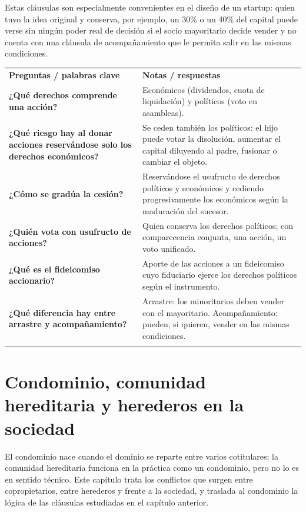 \documentclass[12pt,oneside]{book}
\newcommand{\cq}[1]{\textbf{#1}}
\newcommand{\cornell}[3]{%
  \par\medskip\noindent\begingroup
  \renewcommand{\arraystretch}{1.25}%
  \begin{tabularx}{\textwidth}{|>{\raggedright\arraybackslash}p{0.27\textwidth}|>{\raggedright\arraybackslash}X|}
    \hline
    \multicolumn{2}{|>{\centering\arraybackslash}X|}{\cellcolor{azulacad!12}\textbf{Cuadro Cornell --- #1}}\\ \hline
    \cellcolor{gray!10}\textbf{Preguntas / palabras clave} & \cellcolor{gray!10}\textbf{Notas / respuestas} \\ \hline
    #2
    \multicolumn{2}{|>{\raggedright\arraybackslash}X|}{\cellcolor{azulacad!6}\textbf{Resumen.} #3}\\ \hline
  \end{tabularx}%
  \endgroup\par\medskip}
\begin{document}
Estas cláusulas son especialmente convenientes en el diseño de un startup: quien tuvo la idea original y conserva, por ejemplo, un 30\% o un 40\% del capital puede verse sin ningún poder real de decisión si el socio mayoritario decide vender y no cuenta con una cláusula de acompañamiento que le permita salir en las mismas condiciones.

\cornell{Usufructo de acciones y cláusulas societarias}{
\cq{¿Qué derechos comprende una acción?} & Económicos (dividendos, cuota de liquidación) y políticos (voto en asambleas). \\ \hline
\cq{¿Qué riesgo hay al donar acciones reservándose solo los derechos económicos?} & Se ceden también los políticos: el hijo puede votar la disolución, aumentar el capital diluyendo al padre, fusionar o cambiar el objeto. \\ \hline
\cq{¿Cómo se gradúa la cesión?} & Reservándose el usufructo de derechos políticos y económicos y cediendo progresivamente los económicos según la maduración del sucesor. \\ \hline
\cq{¿Quién vota con usufructo de acciones?} & Quien conserva los derechos políticos; con comparecencia conjunta, una acción, un voto unificado. \\ \hline
\cq{¿Qué es el fideicomiso accionario?} & Aporte de las acciones a un fideicomiso cuyo fiduciario ejerce los derechos políticos según el instrumento. \\ \hline
\cq{¿Qué diferencia hay entre arrastre y acompañamiento?} & Arrastre: los minoritarios deben vender con el mayoritario. Acompañamiento: pueden, si quieren, vender en las mismas condiciones. \\ \hline
}{El usufructo de acciones permite planificar la sucesión de la empresa familiar conservando control, pero exige distinguir derechos económicos y políticos, y graduar su cesión. Las cláusulas de arrastre y acompañamiento protegen a mayoritarios y minoritarios frente a un cambio de control.}

\chapter{Condominio, comunidad hereditaria y herederos en la sociedad}
\label{cap:condominio}

El condominio nace cuando el dominio se reparte entre varios cotitulares; la comunidad hereditaria funciona en la práctica como un condominio, pero no lo es en sentido técnico. Este capítulo trata los conflictos que surgen entre copropietarios, entre herederos y frente a la sociedad, y traslada al condominio la lógica de las cláusulas estudiadas en el capítulo anterior.
\end{document}
